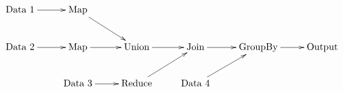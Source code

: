 \documentclass[border=10pt,varwidth]{standalone}
\begin{document}
$$\xymatrix{\mbox{Data 1}\ar[r] & \mbox{Map}\ar[dr]\\
\mbox{Data 2}\ar[r] & \mbox{Map}\ar[r] & \mbox{Union}\ar[r] & \mbox{Join}\ar[r] & \mbox{GroupBy}\ar[r] & \mbox{Output}\\
 & \mbox{Data 3}\ar[r] & \mbox{Reduce}\ar[ur] & \mbox{Data 4}\ar[ur]
}
 $$ 



 
\end{document}
